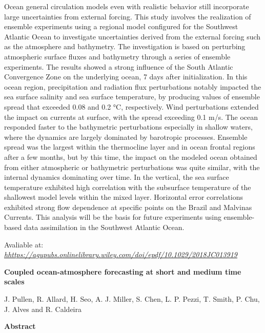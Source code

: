  Ocean general circulation models even with realistic behavior still incorporate large uncertainties from external forcing. This study involves the realization of ensemble experiments using a 
          regional model configured for the Southwest Atlantic Ocean to investigate uncertainties derived from the external forcing such as the atmosphere and bathymetry. The investigation is based on
          perturbing atmospheric surface fluxes and bathymetry through a series of ensemble experiments. The results showed a strong influence of the South Atlantic Convergence Zone on the underlying ocean, 
          7 days after initialization. In this ocean region, precipitation and radiation flux perturbations notably impacted the sea surface salinity and sea surface temperature, by producing values of 
          ensemble spread that exceeded 0.08 and 0.2 °C, respectively. Wind perturbations extended the impact on currents at surface, with the spread exceeding 0.1 m/s. The ocean responded faster to 
          the bathymetric perturbations especially in shallow waters, where the dynamics are largely dominated by barotropic processes. Ensemble spread was the largest within the thermocline layer and in
          ocean frontal regions after a few months, but by this time, the impact on the modeled ocean obtained from either atmospheric or bathymetric perturbations was quite similar, with the internal 
          dynamics dominating over time. In the vertical, the sea surface temperature exhibited high correlation with the subsurface temperature of the shallowest model levels within the mixed layer.
          Horizontal error correlations exhibited strong flow dependence at specific points on the Brazil and Malvinas Currents. This analysis will be the basis for future experiments using ensemble-based 
          data assimilation in the Southwest Atlantic Ocean.
\bigskip

 \textcolor{black}{}
\bigskip

 Avaliable at: \textcolor{bleu_cite}{\href{https://agupubs.onlinelibrary.wiley.com/doi/epdf/10.1029/2018JC013919}{\textit{hhttps://agupubs.onlinelibrary.wiley.com/doi/epdf/10.1029/2018JC013919}}}
\bigskip

\newpage
 \begin{center}
\textbf{Coupled ocean-atmosphere forecasting at short and medium time scales}
\bigskip

 J. Pullen, R. Allard, H. Seo, A. J. Miller, S. Chen, L. P. Pezzi, T. Smith, P. Chu, J. Alves and R. Caldeira
\bigskip

 \textbf{Abstract}\end{center}
\bigskip

